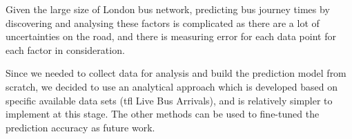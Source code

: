 Given the large size of London bus network, predicting bus journey times by discovering and analysing these factors is complicated as there are a lot of uncertainties on the road, and there is measuring error for each data point for each factor in consideration.

Since we needed to collect data for analysis and build the prediction model from scratch, we decided to use an analytical approach which is developed based on specific available data sets (\acrshort{tfl} Live Bus Arrivals), and is relatively simpler to implement at this stage. The other methods can be used to fine-tuned the prediction accuracy as future work.





